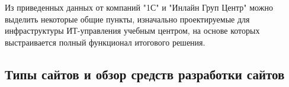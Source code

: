 Из приведенных данных от компаний "1С" и "Инлайн Груп Центр" можно выделить некоторые общие пункты, изначально проектируемые для инфраструктуры ИТ-управления учебным центром, на основе которых выстраивается полный функционал итогового решения.

\subsection{Типы сайтов и обзор средств разработки сайтов}

\begin{comment}
Относительно разделения сайтов на категории существует множество подходов, использующих разные способы выделения ключевых качеств для определенного типа.

Наиболее распространенными способами диффиренциации сайтов являются следующие:
\begin{itemize}
	\item По контенту - какую информацию предоставляет сайт;
	\item По способу предоставления контента - каким образом данные передаются конечному пользователю;
	\item По универсальности отображения контента - адаптирование дизайна элементов сайта под изменямые параметры устройства пользователя;
	\item По функциональности - изначально решаемой сайтом задачей;
\end{itemize}

Исходя из таких категорий можно более подробно рассмотреть каждую из них.

Распределение сайтов по типу контента.

Весьма очевидно, что в зависимости от сферы деятельности организации, будут меняться и данные, которые сайт должен предоставлять пользователю-клиенту.
Например, профессиональное агентство "Студия Вячеслава Денисова" \cite{denisov} выделяет следующие категории:
\begin{itemize}
	\item Блоги
    
    Блоги - регулярно обновляемые страницы, привязанные к определенной личности, либо компании.
	Тематика и способ подачи информации блога могут быть совершенно разнообразными.
    \addimghere{images/LJ.png}{0.6}{Внешний вид сервиса LiveJournal}{LiveJournal}
	Например, некогда очень популярный сайт livejournal.com \cite{livejournal} (Рисунок \ref{LiveJournal}) является платформой для создания и ведения блогов.


\end{comment}
